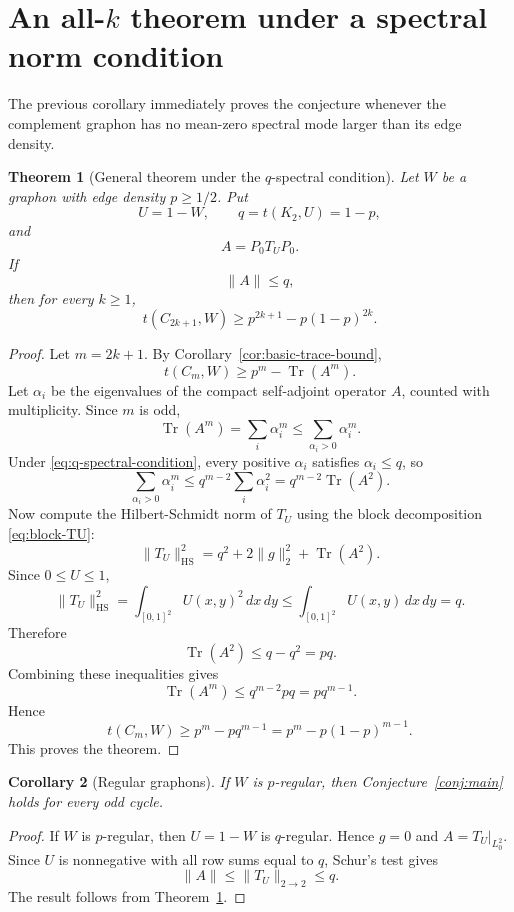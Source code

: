 \documentclass[11pt]{article}
\newtheorem{theorem}{Theorem}[section]
\newtheorem{corollary}[theorem]{Corollary}
\theoremstyle{definition}
\theoremstyle{remark}
\newcommand{\Tr}{\operatorname{Tr}}
\newcommand{\HS}{\mathrm{HS}}
\begin{document}
\section{An all-$k$ theorem under a spectral norm condition}

The previous corollary immediately proves the conjecture whenever the complement graphon has no mean-zero spectral mode larger than its edge density.

\begin{theorem}[General theorem under the $q$-spectral condition]\label{thm:q-spectral}
Let $W$ be a graphon with edge density $p\ge1/2$.  Put
\[
  U=1-W,
  \qquad
  q=t(K_2,U)=1-p,
\]
and
\[
  A=P_0T_UP_0.
\]
If
\begin{equation}\label{eq:q-spectral-condition}
  \|A\|\le q,
\end{equation}
then for every $k\ge1$,
\[
  t(C_{2k+1},W)
  \ge
  p^{2k+1}-p(1-p)^{2k}.
\]
\end{theorem}

\begin{proof}
Let $m=2k+1$.  By Corollary~\ref{cor:basic-trace-bound},
\[
  t(C_m,W)\ge p^m-\Tr(A^m).
\]
Let $\alpha_i$ be the eigenvalues of the compact self-adjoint operator $A$, counted with multiplicity.  Since $m$ is odd,
\[
  \Tr(A^m)
  =\sum_i \alpha_i^m
  \le \sum_{\alpha_i>0}\alpha_i^m.
\]
Under \eqref{eq:q-spectral-condition}, every positive $\alpha_i$ satisfies $\alpha_i\le q$, so
\[
  \sum_{\alpha_i>0}\alpha_i^m
  \le
  q^{m-2}\sum_i\alpha_i^2
  =q^{m-2}\Tr(A^2).
\]
Now compute the Hilbert-Schmidt norm of $T_U$ using the block decomposition \eqref{eq:block-TU}:
\[
  \|T_U\|_{\HS}^2
  =q^2+2\|g\|_2^2+\Tr(A^2).
\]
Since $0\le U\le1$,
\[
  \|T_U\|_{\HS}^2
  =\int_{[0,1]^2}U(x,y)^2\,dx\,dy
  \le
  \int_{[0,1]^2}U(x,y)\,dx\,dy
  =q.
\]
Therefore
\[
  \Tr(A^2)\le q-q^2=pq.
\]
Combining these inequalities gives
\[
  \Tr(A^m)
  \le q^{m-2}pq
  =pq^{m-1}.
\]
Hence
\[
  t(C_m,W)\ge p^m-pq^{m-1}=p^m-p(1-p)^{m-1}.
\]
This proves the theorem.
\end{proof}

\begin{corollary}[Regular graphons]\label{cor:regular}
If $W$ is $p$-regular, then Conjecture~\ref{conj:main} holds for every odd cycle.
\end{corollary}

\begin{proof}
If $W$ is $p$-regular, then $U=1-W$ is $q$-regular.  Hence $g=0$ and $A=T_U|_{L^2_0}$.  Since $U$ is nonnegative with all row sums equal to $q$, Schur's test gives
\[
  \|A\|\le\|T_U\|_{2\to2}\le q.
\]
The result follows from Theorem~\ref{thm:q-spectral}.
\end{proof}
\end{document}
